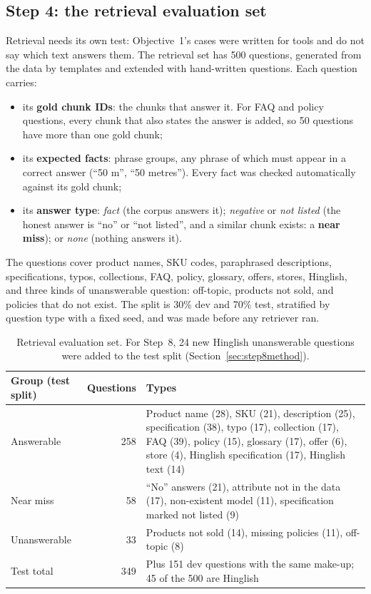 \documentclass[11pt,a4paper]{article}
\begin{document}
\subsection{Step 4: the retrieval evaluation set}\label{sec:retrievaleval}
Retrieval needs its own test: Objective~1's cases were written for tools and do not say which text answers them. The
retrieval set has 500 questions, generated from the data by templates and extended with hand-written questions. Each
question carries:
\begin{itemize}
  \item its \textbf{gold chunk IDs}: the chunks that answer it. For FAQ and policy questions, every chunk that also states
        the answer is added, so 50 questions have more than one gold chunk;
  \item its \textbf{expected facts}: phrase groups, any phrase of which must appear in a correct answer (``50 m'',
        ``50 metres''). Every fact was checked automatically against its gold chunk;
  \item its \textbf{answer type}: \emph{fact} (the corpus answers it); \emph{negative} or \emph{not listed} (the honest
        answer is ``no'' or ``not listed'', and a similar chunk exists: a \textbf{near miss}); or \emph{none}
        (nothing answers it).
\end{itemize}

The questions cover product names, SKU codes, paraphrased descriptions, specifications, typos, collections, FAQ,
policy, glossary, offers, stores, Hinglish, and three kinds of unanswerable question: off-topic, products not sold, and
policies that do not exist. The split is 30\% dev and 70\% test, stratified by question type with a fixed seed, and was
made before any retriever ran.

\begin{table}[H]
\centering
\small
\begin{tabularx}{\textwidth}{l r L}
\toprule
Group (test split) & Questions & Types \\
\midrule
Answerable & 258 & Product name (28), SKU (21), description (25), specification (38), typo (17), collection (17), FAQ
(39), policy (15), glossary (17), offer (6), store (4), Hinglish specification (17), Hinglish text (14) \\
Near miss & 58 & ``No'' answers (21), attribute not in the data (17), non-existent model (11), specification marked not
listed (9) \\
Unanswerable & 33 & Products not sold (14), missing policies (11), off-topic (8) \\
\midrule
Test total & 349 & Plus 151 dev questions with the same make-up; 45 of the 500 are Hinglish \\
\bottomrule
\end{tabularx}
\caption{Retrieval evaluation set. For Step~8, 24 new Hinglish unanswerable questions were added to the test split
(Section~\ref{sec:step8method}).}
\label{tab:evalset}
\end{table}
\end{document}
